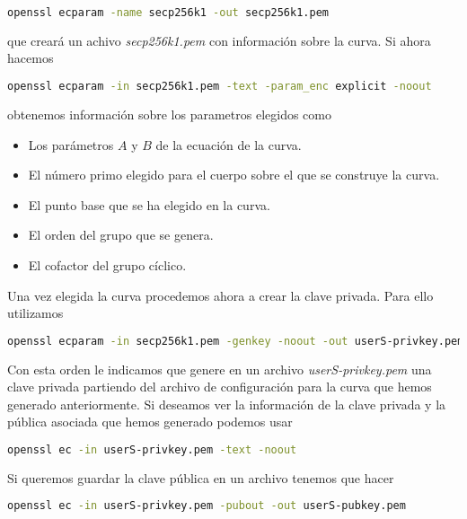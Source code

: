 \documentclass{article}
\begin{document}
\begin{lstlisting}[language=bash]
  openssl ecparam -name secp256k1 -out secp256k1.pem
\end{lstlisting}

que creará un achivo \textit{secp256k1.pem} con información sobre la curva. Si
ahora hacemos

\begin{lstlisting}[language=bash]
  openssl ecparam -in secp256k1.pem -text -param_enc explicit -noout
\end{lstlisting}

obtenemos información sobre los parametros elegidos como 

\begin{itemize}
  \item Los parámetros $A$ y $B$ de la ecuación de la curva.
  \item El número primo elegido para el cuerpo sobre el que se construye la curva.
  \item El punto base que se ha elegido en la curva.
  \item El orden del grupo que se genera.
  \item El cofactor del grupo cíclico.
\end{itemize}

Una vez elegida la curva procedemos ahora a crear la clave privada. Para ello
utilizamos 

\label{genkey}
\begin{lstlisting}[language=bash]
  openssl ecparam -in secp256k1.pem -genkey -noout -out userS-privkey.pem
\end{lstlisting}

Con esta orden le indicamos que genere en un archivo \textit{userS-privkey.pem}
una clave privada partiendo del archivo de configuración para la curva que hemos
generado anteriormente. Si deseamos ver la información de la clave privada y la pública asociada que
hemos generado podemos usar 

\begin{lstlisting}[language=bash]
  openssl ec -in userS-privkey.pem -text -noout
\end{lstlisting}

Si queremos guardar la clave pública en un archivo tenemos que hacer 

\begin{lstlisting}[language=bash]
  openssl ec -in userS-privkey.pem -pubout -out userS-pubkey.pem
\end{lstlisting}
\end{document}
